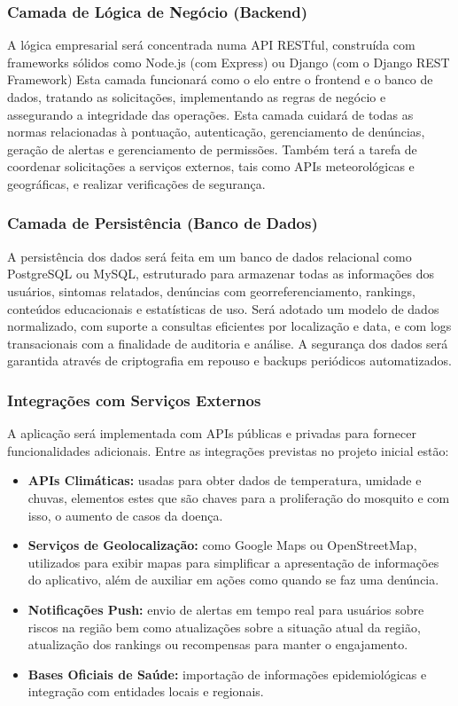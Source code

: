 \documentclass[a5paper, 12pt]{article}
\begin{document}
\subsubsection{Camada de Lógica de Negócio (Backend)}

A lógica empresarial será concentrada numa API RESTful, construída com frameworks sólidos como Node.js (com Express) ou Django (com o Django REST Framework)  Esta camada funcionará como o elo entre o frontend e o banco de dados, tratando as solicitações, implementando as regras de negócio e assegurando a integridade das operações.
Esta camada cuidará de todas as normas relacionadas à pontuação, autenticação, gerenciamento de denúncias, geração de alertas e gerenciamento de permissões.  Também terá a tarefa de coordenar solicitações a serviços externos, tais como APIs meteorológicas e geográficas, e realizar verificações de segurança.

\subsubsection{Camada de Persistência (Banco de Dados)}

A persistência dos dados será feita em um banco de dados relacional como PostgreSQL ou MySQL, estruturado para armazenar todas as informações dos usuários, sintomas relatados, denúncias com georreferenciamento, rankings, conteúdos educacionais e estatísticas de uso.
Será adotado um modelo de dados normalizado, com suporte a consultas eficientes por localização e data, e com logs transacionais com a finalidade de auditoria e análise. A segurança dos dados será garantida através de criptografia em repouso e backups periódicos automatizados.

\subsubsection{Integrações com Serviços Externos}

A aplicação será implementada com APIs públicas e privadas para fornecer funcionalidades adicionais. Entre as integrações previstas no projeto inicial estão:

\begin{itemize}
    \item \textbf{APIs Climáticas:} usadas para obter dados de temperatura, umidade e chuvas, elementos estes que são chaves para a proliferação do mosquito e com isso, o aumento de casos da doença.
    \item \textbf{Serviços de Geolocalização:} como Google Maps ou OpenStreetMap, utilizados para exibir mapas para simplificar a apresentação de informações do aplicativo, além de auxiliar em ações como quando se faz uma denúncia.
    \item \textbf{Notificações Push:} envio de alertas em tempo real para usuários sobre riscos na região bem como atualizações sobre a situação atual da região, atualização dos rankings ou recompensas para manter o engajamento.
    \item \textbf{Bases Oficiais de Saúde:} importação de informações epidemiológicas e integração com entidades locais e regionais.
\end{itemize}
\end{document}
